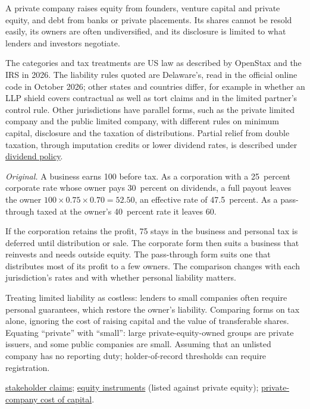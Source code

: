 \begin{qfdefinition}
A private company raises equity from founders, venture capital and private equity, and debt from banks or private placements. Its shares cannot be resold easily, its owners are often undiversified, and its disclosure is limited to what lenders and investors negotiate.

 The categories and tax treatments are US law as described by OpenStax and the IRS in 2026. The liability rules quoted are Delaware's, read in the official online code in October 2026; other states and countries differ, for example in whether an LLP shield covers contractual as well as tort claims and in the limited partner's control rule. Other jurisdictions have parallel forms, such as the private limited company and the public limited company, with different rules on minimum capital, disclosure and the taxation of distributions. Partial relief from double taxation, through imputation credits or lower dividend rates, is described under \hyperref[meth:dividend-policy-evaluation]{dividend policy}.

 \emph{Original.} A business earns 100 before tax. As a corporation with a 25~percent corporate rate whose owner pays 30~percent on dividends, a full payout leaves the owner $100\times0.75\times0.70=52.50$, an effective rate of 47.5~percent. As a pass-through taxed at the owner's 40~percent rate it leaves 60.

If the corporation retains the profit, 75 stays in the business and personal tax is deferred until distribution or sale. The corporate form then suits a business that reinvests and needs outside equity. The pass-through form suits one that distributes most of its profit to a few owners. The comparison changes with each jurisdiction's rates and with whether personal liability matters.

 Treating limited liability as costless: lenders to small companies often require personal guarantees, which restore the owner's liability. Comparing forms on tax alone, ignoring the cost of raising capital and the value of transferable shares. Equating ``private'' with ``small'': large private-equity-owned groups are private issuers, and some public companies are small. Assuming that an unlisted company has no reporting duty; holder-of-record thresholds can require registration.

 \hyperref[def:stakeholder-claims]{stakeholder claims}; \hyperref[def:equity-instruments]{equity instruments} (listed against private equity); \hyperref[meth:cost-of-debt-equity-estimation]{private-company cost of capital}.

\end{qfdefinition}

